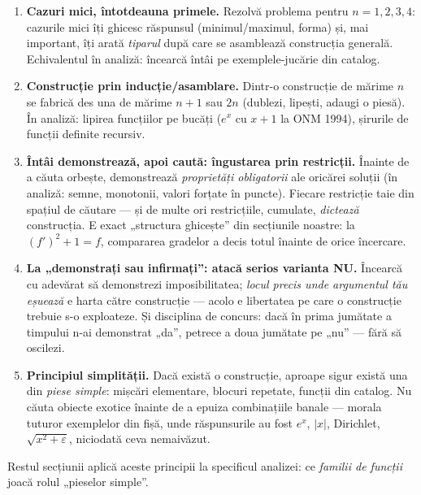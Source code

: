 \begin{enumerate}[leftmargin=*, itemsep=2pt]
\item \textbf{Cazuri mici, întotdeauna primele.} Rezolvă problema pentru $n=1,2,3,4$: cazurile mici îți ghicesc răspunsul (minimul/maximul, forma) și, mai important, îți arată \emph{tiparul} după care se asamblează construcția generală. Echivalentul în analiză: încearcă întâi pe exemplele-jucărie din catalog.
\item \textbf{Construcție prin inducție/asamblare.} Dintr-o construcție de mărime $n$ se fabrică des una de mărime $n+1$ sau $2n$ (dublezi, lipești, adaugi o piesă). În analiză: lipirea funcțiilor pe bucăți ($e^x$ cu $x+1$ la ONM 1994), șirurile de funcții definite recursiv.
\item \textbf{Întâi demonstrează, apoi caută: îngustarea prin restricții.} Înainte de a căuta orbește, demonstrează \emph{proprietăți obligatorii} ale oricărei soluții (în analiză: semne, monotonii, valori forțate în puncte). Fiecare restricție taie din spațiul de căutare --- și de multe ori restricțiile, cumulate, \emph{dictează} construcția. E exact „structura ghicește'' din secțiunile noastre: la $(f')^2+1=f$, compararea gradelor a decis totul înainte de orice încercare.
\item \textbf{La „demonstrați sau infirmați'': atacă serios varianta NU.} Încearcă cu adevărat să demonstrezi imposibilitatea; \emph{locul precis unde argumentul tău eșuează} e harta către construcție --- acolo e libertatea pe care o construcție trebuie s-o exploateze. Și disciplina de concurs: dacă în prima jumătate a timpului n-ai demonstrat „da'', petrece a doua jumătate pe „nu'' --- fără să oscilezi.
\item \textbf{Principiul simplității.} Dacă există o construcție, aproape sigur există una din \emph{piese simple}: mișcări elementare, blocuri repetate, funcții din catalog. Nu căuta obiecte exotice înainte de a epuiza combinațiile banale --- morala tuturor exemplelor din fișă, unde răspunsurile au fost $e^x$, $|x|$, Dirichlet, $\sqrt{x^2+\varepsilon}$, niciodată ceva nemaivăzut.
\end{enumerate}

Restul secțiunii aplică aceste principii la specificul analizei: ce \emph{familii de funcții} joacă rolul „pieselor simple''.

